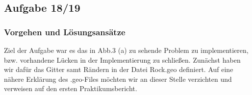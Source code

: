 \subsection{Aufgabe 18/19}
\subsubsection{Vorgehen und Lösungsansätze}
\begin{figure}[H]
	\centering
\end{figure}
Ziel der Aufgabe war es das in Abb.3 (a) zu sehende Problem zu implementieren, bzw. vorhandene Lücken in der Implementierung zu schließen.
Zunächst haben wir dafür das Gitter samt Rändern in der Datei Rock.geo definiert. 
Auf eine nähere Erklärung des .geo-Files möchten wir an dieser Stelle verzichten und verweisen auf den ersten Praktikumsbericht.


